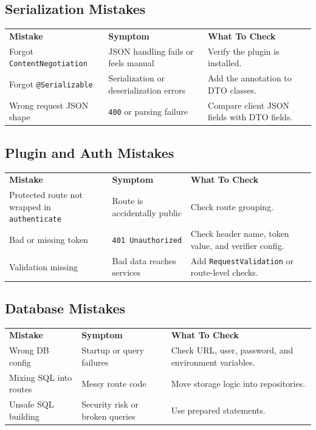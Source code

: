 \documentclass[11pt,a4paper]{article}
\begin{document}
\subsection{Serialization Mistakes}

\begin{longtable}{p{} p{} p{}}
\textbf{Mistake} & \textbf{Symptom} & \textbf{What To Check} \\
Forgot \texttt{ContentNegotiation} & JSON handling fails or feels manual & Verify the plugin is installed. \\
Forgot \texttt{@Serializable} & Serialization or deserialization errors & Add the annotation to DTO classes. \\
Wrong request JSON shape & \texttt{400} or parsing failure & Compare client JSON fields with DTO fields. \\
\end{longtable}

\subsection{Plugin and Auth Mistakes}

\begin{longtable}{p{} p{} p{}}
\textbf{Mistake} & \textbf{Symptom} & \textbf{What To Check} \\
Protected route not wrapped in \texttt{authenticate} & Route is accidentally public & Check route grouping. \\
Bad or missing token & \texttt{401 Unauthorized} & Check header name, token value, and verifier config. \\
Validation missing & Bad data reaches services & Add \texttt{RequestValidation} or route-level checks. \\
\end{longtable}

\subsection{Database Mistakes}

\begin{longtable}{p{} p{} p{}}
\textbf{Mistake} & \textbf{Symptom} & \textbf{What To Check} \\
Wrong DB config & Startup or query failures & Check URL, user, password, and environment variables. \\
Mixing SQL into routes & Messy route code & Move storage logic into repositories. \\
Unsafe SQL building & Security risk or broken queries & Use prepared statements. \\
\end{longtable}
\end{document}
